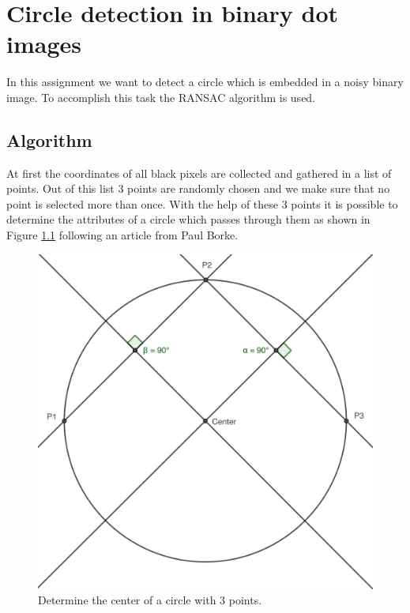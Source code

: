 \chapter{Circle detection in binary dot images}

In this assignment we want to detect a circle which is embedded in a noisy binary image. To accomplish this task the RANSAC algorithm is used. 

\section{Algorithm}

At first the coordinates of all black pixels are collected and gathered in a list of points. Out of this list 3 points are randomly chosen and we make sure that no point is selected more than once.
With the help of these 3 points it is possible to determine the attributes of a circle which passes through them as shown in Figure \ref{CalculateCircle} following an article from Paul Borke\cite{PaulBorke2020}.

\begin{figure}
	\centering
	\includegraphics[width=.55\linewidth]{images/circlefrom3}
	\caption{Determine the center of a circle with 3 points.}
	\label{CalculateCircle}
\end{figure}

